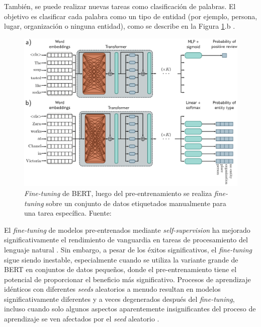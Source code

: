 También, se puede realizar nuevas tareas como clasificación de palabras. El objetivo es clasificar cada palabra como un tipo de entidad (por ejemplo, persona, lugar, organización o ninguna entidad), como se describe en la Figura \ref{fig:bert2}.b \citep{prince2023understanding}.

\begin{figure}[H]
	\centering
	\includegraphics[width=\textwidth]{../img/theory/pre-training2}
	\caption[\textit{Fine-tuning} de BERT]{\textit{Fine-tuning} de BERT, luego del pre-entrenamiento se realiza \textit{fine-tuning} sobre un conjunto de datos etiquetados manualmente para una tarea específica. Fuente: \cite{prince2023understanding}}
	\label{fig:bert2}
\end{figure}


El \textit{fine-tuning} de modelos pre-entrenados mediante \textit{self-supervision} ha mejorado significativamente el rendimiento de vanguardia en tareas de procesamiento del lenguaje natural \citep{zhang2020revisiting}. Sin embargo, a pesar de los éxitos significativos, el \textit{fine-tuning} sigue siendo inestable, especialmente cuando se utiliza la variante grande de BERT en conjuntos de datos pequeños, donde el pre-entrenamiento tiene el potencial de proporcionar el beneficio más significativo. Procesos de aprendizaje idénticos con diferentes \textit{seeds} aleatorios a menudo resultan en modelos significativamente diferentes y a veces degenerados después del \textit{fine-tuning}, incluso cuando solo algunos aspectos aparentemente insignificantes del proceso de aprendizaje se ven afectados por el \textit{seed} aleatorio  \citep{zhang2020revisiting,prince2023understanding}.


